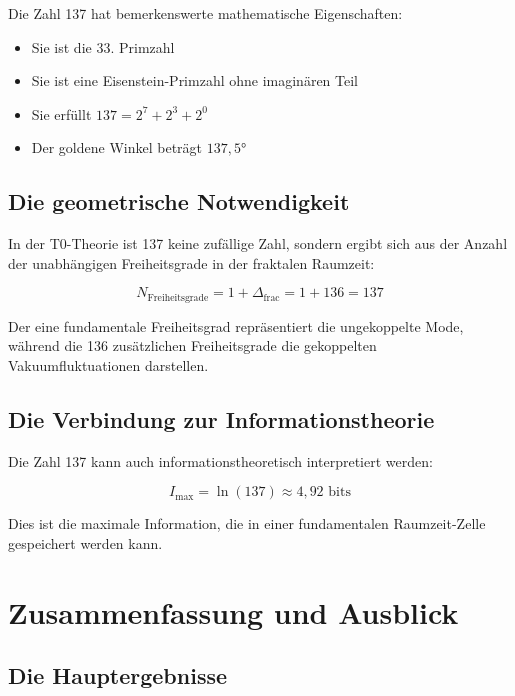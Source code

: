 \documentclass[12pt,a4paper]{article}
\theoremstyle{definition}
\begin{document}
	Die Zahl 137 hat bemerkenswerte mathematische Eigenschaften:
	
	\begin{itemize}
		\item Sie ist die 33. Primzahl
		\item Sie ist eine Eisenstein-Primzahl ohne imaginären Teil
		\item Sie erfüllt $137 = 2^7 + 2^3 + 2^0$
		\item Der goldene Winkel beträgt $137{,}5°$
	\end{itemize}
	
	\subsection{Die geometrische Notwendigkeit}
	
	In der T0-Theorie ist 137 keine zufällige Zahl, sondern ergibt sich aus der Anzahl der unabhängigen Freiheitsgrade in der fraktalen Raumzeit:
	
	\begin{equation}
		N_{\text{Freiheitsgrade}} = 1 + \Delta_{\text{frac}} = 1 + 136 = 137
	\end{equation}
	
	Der eine fundamentale Freiheitsgrad repräsentiert die ungekoppelte Mode, während die 136 zusätzlichen Freiheitsgrade die gekoppelten Vakuumfluktuationen darstellen.
	
	\subsection{Die Verbindung zur Informationstheorie}
	
	Die Zahl 137 kann auch informationstheoretisch interpretiert werden:
	
	\begin{equation}
		I_{\text{max}} = \ln(137) \approx 4{,}92 \text{ bits}
	\end{equation}
	
	Dies ist die maximale Information, die in einer fundamentalen Raumzeit-Zelle gespeichert werden kann.
	
	\section{Zusammenfassung und Ausblick}
	
	\subsection{Die Hauptergebnisse}
	
\end{document}
